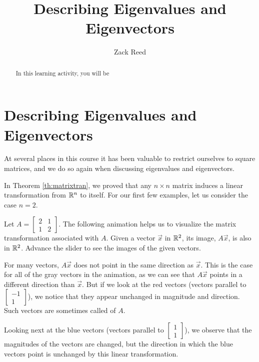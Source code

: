 \documentclass{ximera}
\author{Zack Reed}
\title{Describing Eigenvalues and Eigenvectors}
\begin{document}
\begin{abstract}

    In this learning activity, you will be 
\end{abstract}
\maketitle


\section*{Describing Eigenvalues and Eigenvectors}

    
At several places in this course it has been valuable to restrict ourselves to square matrices, and we do so again when discussing eigenvalues and eigenvectors. 
    
In Theorem \ref{th:matrixtran}, we proved that any $n \times n$  matrix induces a linear transformation from $\mathbb{R}^n$ to itself.  For our first few examples, let us consider the case $n = 2$.
    
\begin{exploration}\label{init:eignintro}
Let $A=\begin{bmatrix} 2& 1\\ 1&2
\end{bmatrix}$.  The following animation helps us to visualize the matrix transformation associated with $A$.  Given a vector $\vec{x}$ in $\mathbb{R}^2$, its image, $A\vec{x}$, is also in $\mathbb{R}^2$.  Advance the slider to see the images of the given vectors.
    
    
\begin{onlineOnly}
\begin{center}
    \end{center}
    \end{onlineOnly}
    
    For many vectors, $A\vec{x}$ does not point in the same direction as $\vec{x}$.  This is the case for all of the gray vectors in the animation, as we can see that $A\vec{x}$ points in a different direction than $\vec{x}$.  But if we look at the red vectors (vectors parallel to $\begin{bmatrix}-1\\1\end{bmatrix}$), we notice that they appear unchanged in magnitude and direction.  Such vectors are sometimes called  of $A$.
    
Looking next at the blue vectors (vectors parallel to $\begin{bmatrix}1\\1\end{bmatrix}$), we observe that the magnitudes of the vectors are changed, but the direction in which the blue vectors point is unchanged by this linear transformation. 
\end{exploration}
    
\end{document}
